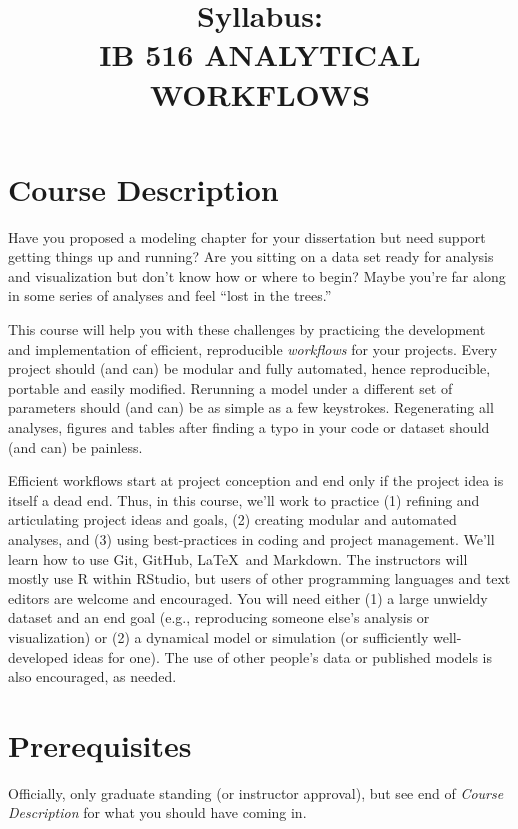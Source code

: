 \documentclass[10pt]{article}
\title{Syllabus:\\IB 516 ANALYTICAL WORKFLOWS}
\author{}
\date{}
\begin{document}
\maketitle
\vspace{-50pt}


\section*{Course Description}
	Have you proposed a modeling chapter for your dissertation but need support getting things up and
	running?
	Are you sitting on a data set ready for analysis and visualization but don't know how or
	where to begin?
	Maybe you're far along in some series of analyses and feel ``lost in the trees.''

	This course will help you with these challenges by practicing the development and implementation of
	efficient, reproducible \emph{workflows} for your projects.
	Every project should (and can) be modular and fully automated, hence reproducible, portable and
	easily modified.
	Rerunning a model under a different set of parameters should (and can) be as simple as a few
	keystrokes.
	Regenerating all analyses, figures and tables after finding a typo in your code or dataset should (and
	can) be painless.

	Efficient workflows start at project conception and end only if the project idea is itself a dead end.
	Thus, in this course, we'll work to practice
	(1) refining and articulating project ideas and goals,
	(2) creating modular and automated analyses, and
	(3) using best-practices in coding and project management.
	We'll learn how to use Git, GitHub, \LaTeX\, and Markdown.
	The instructors will mostly use \textsf{R} within RStudio, but users of other programming languages
	and text editors are welcome and encouraged.
	You will need either
	(1) a large unwieldy dataset and an end goal (e.g., reproducing someone else's analysis or
	visualization) or
	(2) a dynamical model or simulation (or sufficiently well-developed ideas for one).
	The use of other people's data or published models is also encouraged, as needed.

\section*{Prerequisites}
\noindent
	Officially, only graduate standing (or instructor approval), but see end of 
	\emph{Course Description} for what you should have coming in.
\end{document}
